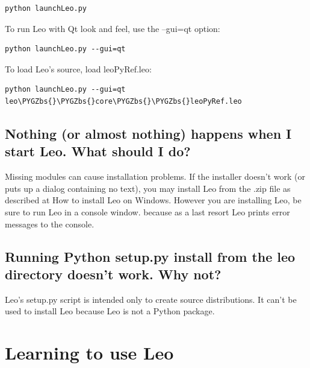 \documentclass[a4paper,10pt,english]{sphinxmanual}
\def\PYGZbs{\char`\\}
\begin{document}
\begin{Verbatim}[commandchars=\\\{\}]
python launchLeo.py
\end{Verbatim}

To run Leo with Qt look and feel, use the --gui=qt option:

\begin{Verbatim}[commandchars=\\\{\}]
python launchLeo.py --gui=qt
\end{Verbatim}

To load Leo's source, load leoPyRef.leo:

\begin{Verbatim}[commandchars=\\\{\}]
python launchLeo.py --gui=qt leo\PYGZbs{}\PYGZbs{}core\PYGZbs{}\PYGZbs{}leoPyRef.leo
\end{Verbatim}


\subsection{Nothing (or almost nothing) happens when I start Leo.  What should I do?}
\label{FAQ:nothing-or-almost-nothing-happens-when-i-start-leo-what-should-i-do}
Missing modules can cause installation problems.
If the installer doesn't work (or puts up a dialog containing no text), you may install Leo from the .zip file
as described at How to install Leo on Windows.
However you are installing Leo,
be sure to run Leo in a console window.
because as a last resort Leo prints error messages to the console.


\subsection{Running Python setup.py install from the leo directory doesn't work.  Why not?}
\label{FAQ:running-python-setup-py-install-from-the-leo-directory-doesn-t-work-why-not}
Leo's setup.py script is intended only to create source distributions. It can't
be used to install Leo because Leo is not a Python package.


\section{Learning to use Leo}
\label{FAQ:learning-to-use-leo}
\end{document}

